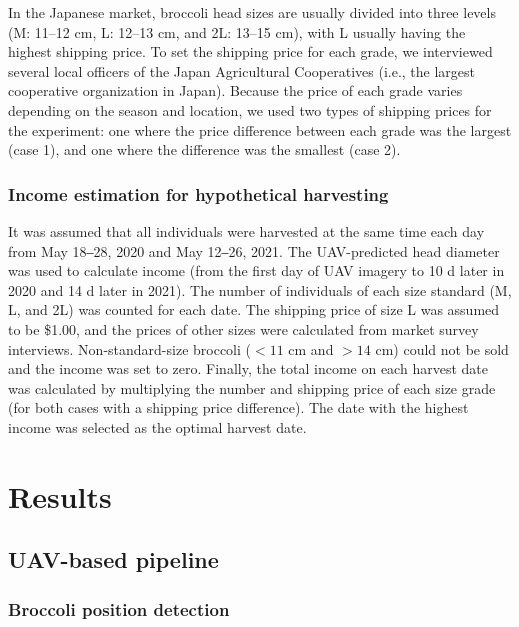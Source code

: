 In the Japanese market, broccoli head sizes are usually divided into three levels (M: 11–12 cm, L: 12–13 cm, and 2L: 13–15 cm), with L usually having the highest shipping price. To set the shipping price for each grade, we interviewed several local officers of the Japan Agricultural Cooperatives (i.e., the largest cooperative organization in Japan). Because the price of each grade varies depending on the season and location, we used two types of shipping prices for the experiment: one where the price difference between each grade was the largest (case 1), and one where the difference was the smallest (case 2).

\subsubsection*{Income estimation for hypothetical harvesting}

It was assumed that all individuals were harvested at the same time each day from May 18‒28, 2020 and May 12‒26, 2021. The UAV-predicted head diameter was used to calculate income (from the first day of UAV imagery to 10 d later in 2020 and 14 d later in 2021). The number of individuals of each size standard (M, L, and 2L) was counted for each date. The shipping price of size L was assumed to be \$1.00, and the prices of other sizes were calculated from market survey interviews. Non-standard-size broccoli ($< 11$ cm and $> 14$ cm) could not be sold and the income was set to zero. Finally, the total income on each harvest date was calculated by multiplying the number and shipping price of each size grade (for both cases with a shipping price difference). The date with the highest income was selected as the optimal harvest date.

\section{Results}

\subsection{UAV-based pipeline}

\subsubsection*{Broccoli position detection}


